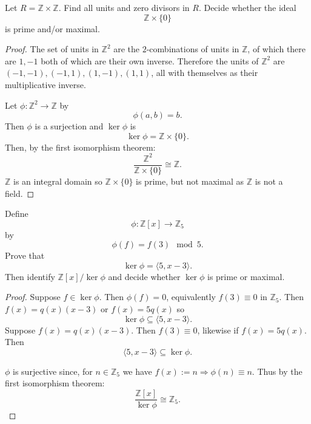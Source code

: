 \begin{prob}
    Let $R = \mathbb Z \times \mathbb Z$.
    Find all units and zero divisors in 
    $R$.
    Decide whether the ideal 
    \[
        \mathbb Z \times \{0\}
    \]
    is prime and/or maximal.
\end{prob}
\begin{proof}
    The set of units in $\mathbb Z^2$ are 
    the $2$-combinations of units in 
    $\mathbb Z$, of which there are $1,-1$ 
    both of which are their own inverse. 
    Therefore the units of $\mathbb Z^2$ are 
    $(-1,-1), (-1,1), (1,-1), (1,1)$, all 
    with themselves as their multiplicative inverse. 

    Let $\phi : \mathbb Z^2 \to \mathbb Z$ by 
    \[
        \phi(a,b) = b. 
    \]
    Then $\phi$ is a surjection and $\ker \phi$ is 
    \[
        \ker \phi = \mathbb Z \times \{0\}.
    \]
    Then, by the first isomorphism theorem: 
    \[
        \frac{\mathbb Z^2}{\mathbb Z\times \{0\}} 
        \cong \mathbb Z. 
    \]
    $\mathbb Z$ is an integral domain so $\mathbb Z 
    \times \{0\}$ is prime, but not maximal as 
    $\mathbb Z$ is not a field. 
\end{proof}
\begin{prob}
    Define 
    \[
        \phi : \mathbb Z[x] \to \mathbb Z_5
    \]
    by 
    \[
        \phi(f) = f(3) \mod 5.  
    \]
    Prove that 
    \[
        \ker \phi = \langle 5, x-3\rangle. 
    \]
    Then identify $\mathbb Z[x]/\ker \phi$ and 
    decide whether $\ker \phi$ is prime or 
    maximal.
\end{prob}
\begin{proof}
    Suppose $f \in \ker \phi$. 
    Then $\phi (f) = 0$, equivalently 
    $f(3) \equiv 0$ in $\mathbb Z_5$.   
    Then $f(x) = q(x)(x-3)$ or 
    $f(x) = 5q(x)$ so 
    \[
        \ker \phi \subseteq \langle 5, x-3\rangle.
    \]
    Suppose $f(x) = q(x)(x-3)$. Then 
    $f(3) \equiv 0$, likewise if 
    $f(x) = 5q(x)$. Then 
    \[
        \langle 5,x-3 \rangle \subseteq \ker \phi.
    \]

    $\phi$ is surjective since, for $n \in \mathbb Z_5$ we have 
    $f(x) := n \Rightarrow \phi(n) \equiv n$. Thus by the first 
    isomorphism theorem: 
    \[
        \frac{\mathbb Z[x]}{\ker \phi} 
        \cong \mathbb Z_5.
    \]
\end{proof}

